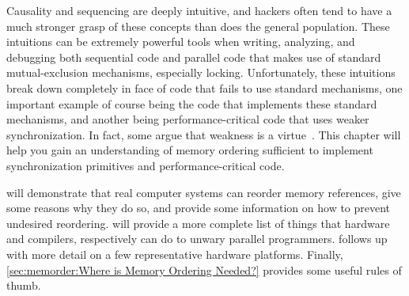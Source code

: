 
%

Causality and sequencing are deeply intuitive, and hackers often
tend to have a much stronger grasp of these concepts than does
the general population.
These intuitions can be extremely powerful tools when writing, analyzing,
and debugging both sequential code and parallel code that makes
use of standard mutual-exclusion mechanisms, especially locking.
Unfortunately, these intuitions break down completely in face of
code that fails to use standard mechanisms, one important example
of course being the code that implements these standard mechanisms,
and another being performance-critical code that uses weaker
synchronization.
In fact, some argue that weakness is a
virtue~\cite{JadeAlglave2013-WeaknessIsVirtue}.
This chapter will help you gain an understanding of memory ordering
sufficient to implement synchronization primitives and
performance-critical code.

will demonstrate that real computer systems can reorder memory references,
give some reasons why they do so, and provide some information on how
to prevent undesired reordering.
will provide a more complete list of things that hardware and compilers,
respectively can do to unwary parallel programmers.
follows up with more detail on a few representative hardware platforms.
Finally, \cref{sec:memorder:Where is Memory Ordering Needed?}
provides some useful rules of thumb.

